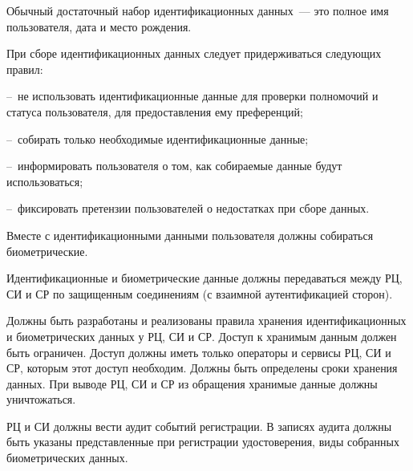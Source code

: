 \begin{note}
Обычный достаточный набор идентификационных данных~--- это 
полное имя пользователя, дата и место рождения.
\end{note}

\begin{note}
При сборе идентификационных данных следует придерживаться следующих правил: 

--~не использовать идентификационные данные для проверки полномочий 
и статуса пользователя, для предоставления ему преференций;

--~собирать только необходимые идентификационные данные;

%

--~информировать пользователя о том, как собираемые данные будут использоваться;

--~фиксировать претензии пользователей о недостатках при сборе данных.
\end{note}


Вместе с идентификационными данными пользователя должны собираться  
биометрические. 

Идентификационные и биометрические данные должны передаваться между
РЦ, СИ и СР по защищенным соединениям (с взаимной аутентификацией сторон).

Должны быть разработаны и реализованы правила хранения идентификационных 
и биометрических данных у РЦ, СИ и СР. 
%
Доступ к хранимым данным должен быть ограничен.
Доступ должны иметь только операторы и сервисы РЦ, СИ и СР,
которым этот доступ необходим. 
%
Должны быть определены сроки хранения данных.
%
При выводе РЦ, СИ и СР из обращения хранимые данные должны уничтожаться.


\label{R.UR.Audit}
РЦ и СИ должны вести аудит событий регистрации. В записях аудита 
должны быть указаны представленные при регистрации удостоверения,
виды собранных биометрических данных.


